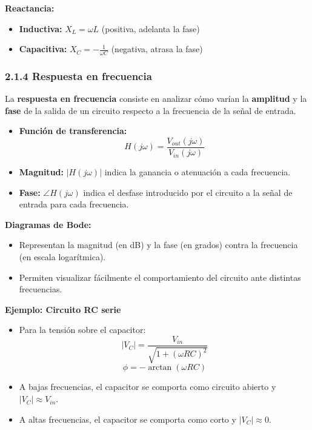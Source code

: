 \documentclass[12pt]{article}
\begin{document}
\textbf{Reactancia:}
\begin{itemize}
    \item \textbf{Inductiva:} $X_L = \omega L$ (positiva, adelanta la fase)
    \item \textbf{Capacitiva:} $X_C = -\frac{1}{\omega C}$ (negativa, atrasa la fase)
\end{itemize}

\vspace{0.5cm}
\subsubsection*{2.1.4 Respuesta en frecuencia}

La \textbf{respuesta en frecuencia} consiste en analizar cómo varían la \textbf{amplitud} y la \textbf{fase} de la salida de un circuito respecto a la frecuencia de la señal de entrada.

\begin{itemize}
    \item \textbf{Función de transferencia:} 
    \[
        H(j\omega) = \frac{V_{out}(j\omega)}{V_{in}(j\omega)}
    \]
    \item \textbf{Magnitud:} $|H(j\omega)|$ indica la ganancia o atenuación a cada frecuencia.
    \item \textbf{Fase:} $\angle H(j\omega)$ indica el desfase introducido por el circuito a la señal de entrada para cada frecuencia.
\end{itemize}

\textbf{Diagramas de Bode:}
\begin{itemize}
    \item Representan la magnitud (en dB) y la fase (en grados) contra la frecuencia (en escala logarítmica).
    \item Permiten visualizar fácilmente el comportamiento del circuito ante distintas frecuencias.
\end{itemize}

\textbf{Ejemplo: Circuito RC serie}
\begin{itemize}
    \item Para la tensión sobre el capacitor:
    \[
        |V_C| = \frac{V_{in}}{\sqrt{1 + (\omega RC)^2}}
    \]
    \[
        \phi = -\arctan(\omega RC)
    \]
    \item A bajas frecuencias, el capacitor se comporta como circuito abierto y $|V_C| \approx V_{in}$.
    \item A altas frecuencias, el capacitor se comporta como corto y $|V_C| \approx 0$.
\end{itemize}
\end{document}
